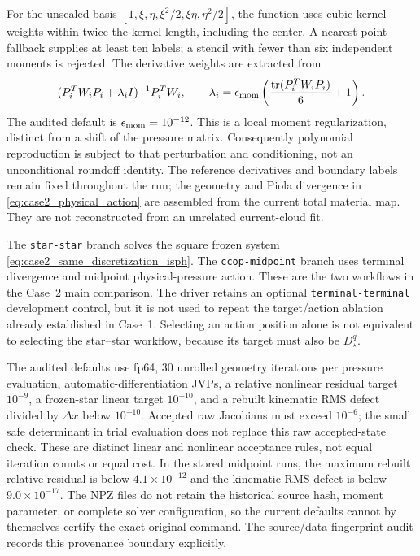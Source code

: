 \documentclass[11pt]{article}
\theoremstyle{plain}
\theoremstyle{definition}
\theoremstyle{remark}
\begin{document}
For the unscaled basis
$[1,\xi,\eta,\xi^2/2,\xi\eta,\eta^2/2]$, the function uses cubic-kernel
weights within twice the kernel length, including the center.  A nearest-point
fallback supplies at least ten labels; a stencil with fewer than six
independent moments is rejected.  The derivative weights are extracted from
\begin{equation}
 (P_i^TW_iP_i+\lambda_iI)^{-1}P_i^TW_i,\qquad
 \lambda_i=\epsilon_{\rm mom}
 \left(\frac{\operatorname{tr}(P_i^TW_iP_i)}{6}+1\right).
 \label{eq:case2_moment_convention}
\end{equation}
The audited default is $\epsilon_{\rm mom}=10^{-12}$.  This is a local
moment regularization, distinct from a shift of the pressure matrix.
Consequently polynomial reproduction is subject to that perturbation and
conditioning, not an unconditional roundoff identity.  The reference
derivatives and boundary labels remain fixed throughout the run; the geometry
and Piola divergence in \eqref{eq:case2_physical_action} are assembled from
the current total material map.  They are not reconstructed from an unrelated
current-cloud fit.

The \texttt{star-star} branch solves the square frozen system
\eqref{eq:case2_same_discretization_isph}.  The \texttt{ccop-midpoint} branch
uses terminal divergence and midpoint physical-pressure action.  These are the
two workflows in the Case~2 main comparison.  The driver retains an optional
\texttt{terminal-terminal} development control, but it is not used to repeat
the target/action ablation already established in Case~1.  Selecting an action
position alone is not equivalent to selecting the star--star workflow, because
its target must also be $D_\star^q$.

The audited defaults use fp64, 30 unrolled geometry iterations per pressure
evaluation, automatic-differentiation JVPs, a relative nonlinear residual
target $10^{-9}$, a frozen-star linear target $10^{-10}$, and a rebuilt
kinematic RMS defect divided by $\Delta x$ below $10^{-10}$.  Accepted raw
Jacobians must exceed $10^{-6}$; the small safe determinant in trial evaluation
does not replace this raw accepted-state check.  These are distinct linear
and nonlinear acceptance rules, not equal iteration counts or equal cost.
In the stored midpoint runs, the maximum rebuilt relative residual is below
$4.1\times10^{-12}$ and the kinematic RMS defect is below $9.0\times10^{-17}$.
The NPZ files do not retain the historical source hash, moment parameter, or
complete solver configuration, so the current defaults cannot by themselves
certify the exact original command.  The source/data fingerprint audit records
this provenance boundary explicitly.
\end{document}

